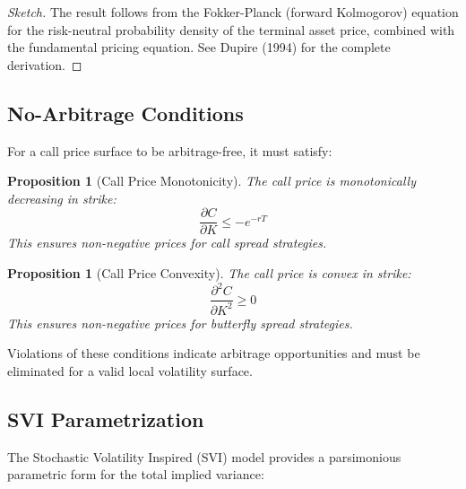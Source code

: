 \documentclass[12pt,a4paper]{article}
\newtheorem{proposition}[theorem]{Proposition}
\begin{document}
\begin{proof}[Sketch]
The result follows from the Fokker-Planck (forward Kolmogorov) equation for the risk-neutral probability density of the terminal asset price, combined with the fundamental pricing equation. See Dupire (1994) for the complete derivation.
\end{proof}

\subsection{No-Arbitrage Conditions}

For a call price surface to be arbitrage-free, it must satisfy:

\begin{proposition}[Call Price Monotonicity]
The call price is monotonically decreasing in strike:
\begin{equation}
    \frac{\partial C}{\partial K} \leq -e^{-rT}
\end{equation}
This ensures non-negative prices for call spread strategies.
\end{proposition}

\begin{proposition}[Call Price Convexity]
The call price is convex in strike:
\begin{equation}
    \frac{\partial^2 C}{\partial K^2} \geq 0
\end{equation}
This ensures non-negative prices for butterfly spread strategies.
\end{proposition}

Violations of these conditions indicate arbitrage opportunities and must be eliminated for a valid local volatility surface.

\subsection{SVI Parametrization}

The Stochastic Volatility Inspired (SVI) model \cite{Gatheral2004} provides a parsimonious parametric form for the total implied variance:
\end{document}
